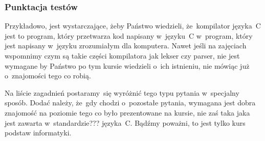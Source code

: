 \documentclass[10pt,t]{beamer}
\begin{document}
\begin{frame}
  \frametitle{Punktacja testów}



  Przykładowo, jest wystarczające, żeby Państwo wiedzieli, że~kompilator
  języka~C jest to program, który przetwarza kod napisany w~języku~C
  w~program, który jest napisany w~języku zrozumiałym dla komputera.
  Nawet jeśli na zajęciach wspomnimy czym są takie części kompilatora
  jak lekser czy parser, nie jest wymagane by Państwo po tym kursie
  wiedzieli o~ich istnieniu, nie mówiąc już o~znajomości tego co robią.

  Na liście zagadnień postaramy~się wyróżnić tego typu pytania w~specjalny
  sposób. Dodać należy, że~gdy chodzi o~pozostałe pytania, wymagana jest
  dobra znajomość na \alert{poziomie tego co było prezentowane na kursie},
  nie zaś taka jaka jest zawarta w~standardzie??? języka~C. Bądźmy poważni,
  to jest tylko kurs podstaw informatyki.













\end{frame}
\end{document}
